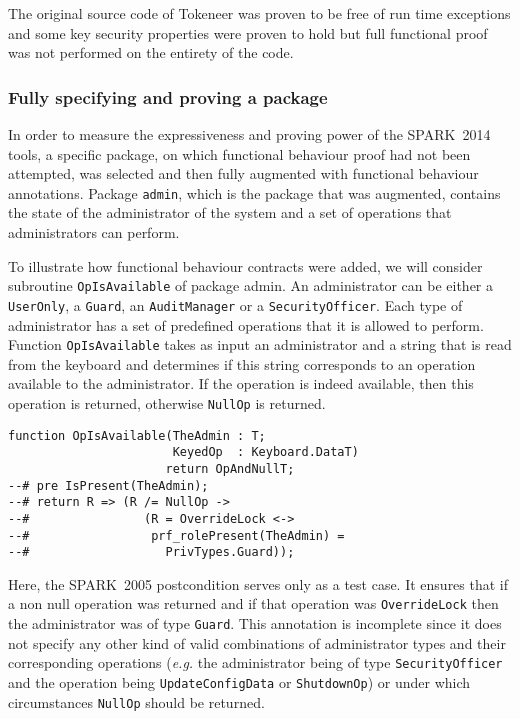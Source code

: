 \documentclass[10pt,a4paper,twocolumn]{article}
\newcommand{\oldspark}{SPARK~2005\xspace}
\newcommand{\newspark}{SPARK~2014\xspace}
\newcommand{\eg}{\textit{e.g.}\xspace}
\newcommand{\SPARK}[1]{\lstinline[language=Ada,basicstyle={\footnotesize
      \sffamily},framesep=0pt]$#1$}
\begin{document}
The original source code of Tokeneer was proven to be free of run time
exceptions and some key security properties were proven to hold but
full functional proof was not performed on the entirety of the code.

\subsubsection{Fully specifying and proving a package}

In order to measure the expressiveness and proving power of the
\newspark tools, a specific package, on which functional behaviour
proof had not been attempted, was selected and then fully augmented
with functional behaviour annotations. Package \SPARK{admin}, which is
the package that was augmented, contains the state of the
administrator of the system and a set of operations that
administrators can perform.

To illustrate how functional behaviour contracts were added, we will consider
subroutine \SPARK{OpIsAvailable} of package admin. An administrator can be
either a \SPARK{UserOnly}, a \SPARK{Guard}, an \SPARK{AuditManager} or a
\SPARK{SecurityOfficer}. Each type of administrator has a set of predefined
operations that it is allowed to perform. Function \SPARK{OpIsAvailable} takes
as input an administrator and a string that is read from the keyboard and
determines if this string corresponds to an operation available to the
administrator. If the operation is indeed available, then this operation is
returned, otherwise \SPARK{NullOp} is returned.

\begin{lstlisting}
function OpIsAvailable(TheAdmin : T;
                       KeyedOp  : Keyboard.DataT)
                      return OpAndNullT;
--# pre IsPresent(TheAdmin);
--# return R => (R /= NullOp ->
--#                (R = OverrideLock <->
--#                 prf_rolePresent(TheAdmin) =
--#                   PrivTypes.Guard));
\end{lstlisting}
Here, the \oldspark postcondition serves only as a test case. It
ensures that if a non null operation was returned and if that
operation was \SPARK{OverrideLock} then the administrator was of type
\SPARK{Guard}. This annotation is incomplete since it does not specify
any other kind of valid combinations of administrator types and their
corresponding operations (\eg the administrator being of type
\SPARK{SecurityOfficer} and the operation being \SPARK{UpdateConfigData}
or \SPARK{ShutdownOp}) or under which circumstances \SPARK{NullOp}
should be returned.
\end{document}
